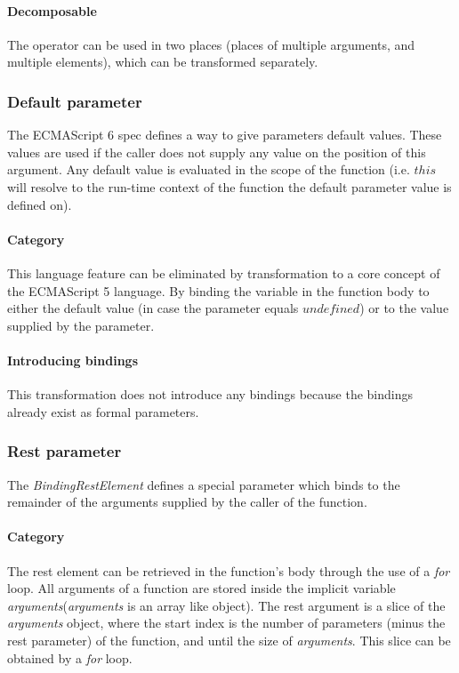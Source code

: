 \paragraph{Decomposable}
The operator can be used in two places (places of multiple arguments, and multiple elements), which can be transformed separately.

\subsubsection{Default parameter}
The ECMAScript 6 spec defines a way to give parameters default values\cite[9.2.12]{SpecJS}. These values are used if the caller does not supply any value on the position of this argument. Any default value is evaluated in the scope of the function (i.e. $this$ will resolve to the run-time context of the function the default parameter value is defined on).

\paragraph{Category}
This language feature can be eliminated by transformation to a core concept of the ECMAScript 5 language. By binding the variable in the function body to either the default value (in case the parameter equals $undefined$) or to the value supplied by the parameter.

\paragraph{Introducing bindings}
This transformation does not introduce any bindings because the bindings already exist as formal parameters.

\subsubsection{Rest parameter}
The \textit{BindingRestElement} defines a special parameter which binds to the remainder of the arguments supplied by the caller of the function.\cite[14.1]{SpecJS}

\paragraph{Category}
The rest element can be retrieved in the function's body through the use of a \textit{for} loop. All arguments of a function are stored inside the implicit variable \textit{arguments}\footnotemark (\textit{arguments} is an array like object). The rest argument is a slice of the \textit{arguments} object, where the start index is the number of parameters (minus the rest parameter) of the function, and until the size of \textit{arguments}. This slice can be obtained by a \textit{for} loop.


